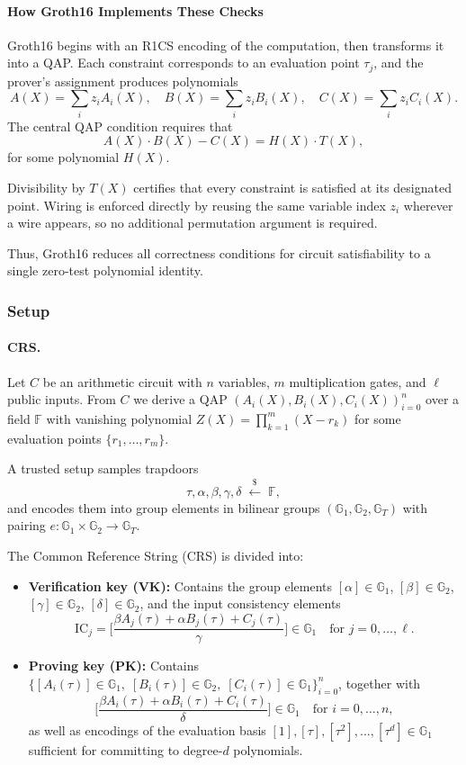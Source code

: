 \paragraph{How Groth16 Implements These Checks}
Groth16 begins with an R1CS encoding of the computation, then transforms it into a QAP.  
Each constraint corresponds to an evaluation point $\tau_j$, and the prover’s assignment produces polynomials
\[
A(X) = \sum_i z_i A_i(X), \quad 
B(X) = \sum_i z_i B_i(X), \quad 
C(X) = \sum_i z_i C_i(X).
\]
The central QAP condition requires that
\[
A(X) \cdot B(X) - C(X) = H(X) \cdot T(X),
\]
for some polynomial $H(X)$.  

Divisibility by $T(X)$ certifies that every constraint is satisfied at its designated point.  
Wiring is enforced directly by reusing the same variable index $z_i$ wherever a wire appears,  
so no additional permutation argument is required.  

Thus, Groth16 reduces all correctness conditions for circuit satisfiability to a single zero-test polynomial identity.

\subsubsection*{Setup}

\paragraph{CRS.}
Let $C$ be an arithmetic circuit with $n$ variables, $m$ multiplication gates, 
and $\ell$ public inputs. 
From $C$ we derive a QAP $(A_i(X),B_i(X),C_i(X))_{i=0}^n$ over a field $\mathbb{F}$ 
with vanishing polynomial $Z(X) = \prod_{k=1}^m (X - r_k)$ for some evaluation points $\{r_1,\ldots,r_m\}$. 

A trusted setup samples trapdoors 
\[
\tau,\alpha,\beta,\gamma,\delta \;\xleftarrow{\$}\;\mathbb{F},
\]
and encodes them into group elements in bilinear groups 
$(\mathbb{G}_1,\mathbb{G}_2,\mathbb{G}_T)$ with pairing $e:\mathbb{G}_1\times \mathbb{G}_2\to\mathbb{G}_T$.

The Common Reference String (CRS) is divided into:
\begin{itemize}
    \item \textbf{Verification key (VK):} 
    Contains the group elements $[\alpha]\in\mathbb{G}_1$, $[\beta]\in\mathbb{G}_2$, $[\gamma]\in\mathbb{G}_2$, $[\delta]\in\mathbb{G}_2$, 
    and the input consistency elements
    \[
    \mathrm{IC}_j = \Big[\frac{\beta A_j(\tau)+\alpha B_j(\tau)+C_j(\tau)}{\gamma}\Big] \in \mathbb{G}_1
    \quad\text{for } j=0,\dots,\ell.
    \]

    \item \textbf{Proving key (PK):} 
    Contains $\{[A_i(\tau)]\in\mathbb{G}_1,\; [B_i(\tau)]\in\mathbb{G}_2,\; [C_i(\tau)]\in\mathbb{G}_1\}_{i=0}^n$, 
    together with 
    \[
    \Big[\frac{\beta A_i(\tau)+\alpha B_i(\tau)+C_i(\tau)}{\delta}\Big]\in \mathbb{G}_1 \quad \text{for } i=0,\dots,n,
    \]
    as well as encodings of the evaluation basis $[1],[\tau],[\tau^2],\ldots,[\tau^d] \in \mathbb{G}_1$
    sufficient for committing to degree-$d$ polynomials.  
\end{itemize}

